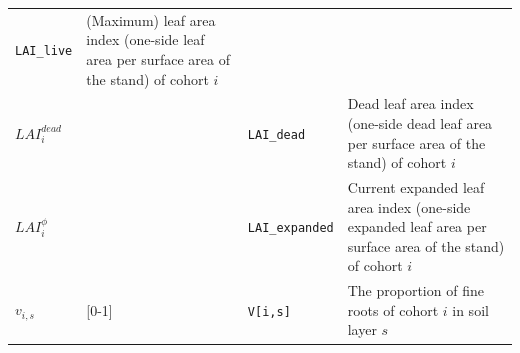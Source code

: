 \documentclass[]{book}
\begin{document}
\begin{longtable}[]{@{}llll@{}}
\begin{minipage}[t]{0.12\columnwidth}
\texttt{LAI\_live}\strut
\end{minipage} & \begin{minipage}[t]{0.45\columnwidth}\raggedright\strut
(Maximum) leaf area index (one-side leaf area per surface area of the
stand) of cohort \(i\)\strut
\end{minipage}\tabularnewline
\begin{minipage}[t]{0.11\columnwidth}\raggedright\strut
\(LAI^{dead}_i\)\strut
\end{minipage} & \begin{minipage}[t]{0.10\columnwidth}\raggedright\strut
\strut
\end{minipage} & \begin{minipage}[t]{0.12\columnwidth}\raggedright\strut
\texttt{LAI\_dead}\strut
\end{minipage} & \begin{minipage}[t]{0.45\columnwidth}\raggedright\strut
Dead leaf area index (one-side dead leaf area per surface area of the
stand) of cohort \(i\)\strut
\end{minipage}\tabularnewline
\begin{minipage}[t]{0.11\columnwidth}\raggedright\strut
\(LAI^{\phi}_i\)\strut
\end{minipage} & \begin{minipage}[t]{0.10\columnwidth}\raggedright\strut
\strut
\end{minipage} & \begin{minipage}[t]{0.12\columnwidth}\raggedright\strut
\texttt{LAI\_expanded}\strut
\end{minipage} & \begin{minipage}[t]{0.45\columnwidth}\raggedright\strut
Current expanded leaf area index (one-side expanded leaf area per
surface area of the stand) of cohort \(i\)\strut
\end{minipage}\tabularnewline
\begin{minipage}[t]{0.11\columnwidth}\raggedright\strut
\(v_{i,s}\)\strut
\end{minipage} & \begin{minipage}[t]{0.10\columnwidth}\raggedright\strut
{[}0-1{]}\strut
\end{minipage} & \begin{minipage}[t]{0.12\columnwidth}\raggedright\strut
\texttt{V{[}i,s{]}}\strut
\end{minipage} & \begin{minipage}[t]{0.45\columnwidth}\raggedright\strut
The proportion of fine roots of cohort \(i\) in soil layer \(s\)\strut

\end{minipage}
\end{longtable}
\end{document}
